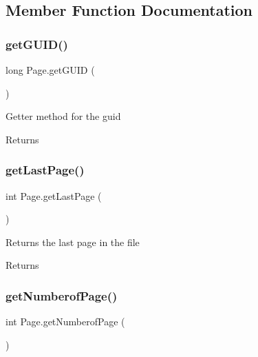\subsection{Member Function Documentation}
\mbox{\label{class_page_ae03fb4ac6c970f18341b44db9005ae73}} 
\subsubsection{\texorpdfstring{get\+G\+U\+I\+D()}{getGUID()}}
{\footnotesize\ttfamily long Page.\+get\+G\+U\+ID (\begin{DoxyParamCaption}{ }\end{DoxyParamCaption})\hspace{0.3cm}{\ttfamily [inline]}}

Getter method for the guid \begin{DoxyReturn}{Returns}

\end{DoxyReturn}
\mbox{\label{class_page_a043162c0962d7d61e5779646945c1398}} 
\subsubsection{\texorpdfstring{get\+Last\+Page()}{getLastPage()}}
{\footnotesize\ttfamily int Page.\+get\+Last\+Page (\begin{DoxyParamCaption}{ }\end{DoxyParamCaption})\hspace{0.3cm}{\ttfamily [inline]}}

Returns the last page in the file \begin{DoxyReturn}{Returns}

\end{DoxyReturn}
\mbox{\label{class_page_ac09e9a5287042812d1d2643650a1dbf5}} 
\subsubsection{\texorpdfstring{get\+Numberof\+Page()}{getNumberofPage()}}
{\footnotesize\ttfamily int Page.\+get\+Numberof\+Page (\begin{DoxyParamCaption}{ }\end{DoxyParamCaption})\hspace{0.3cm}{\ttfamily [inline]}}

